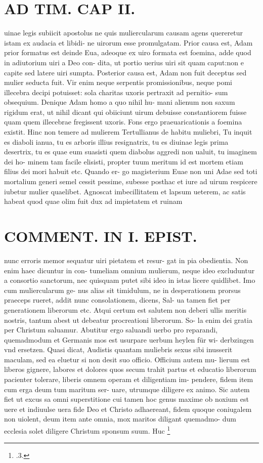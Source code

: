 \documentclass{article}
\begin{document}
\begin{pages}
\section*{AD TIM. CAP II. }
\marginpar{[ p.121 ]}\pstart uinae legis subiicit apostolus ne quis muliercularum causam agens quereretur istam ex audacia et libidi- ne uirorum esse promulgatam. Prior causa est, Adam prior formatus est deinde Eua, adeoque ex uiro formata est foemina, adde quod in adiutorium uiri a Deo con- dita, ut portio uerius uiri sit quam caput:non e capite sed latere uiri sumpta. Posterior causa est, Adam non fuit deceptus sed mulier seducta fuit. Vir enim neque serpentis promissionibus, neque pomi illecebra decipi potuisset: sola charitas uxoris pertraxit ad pernitio- sum obsequium. Denique Adam homo a quo nihil hu- mani alienum non saxum rigidum erat, ut nihil dicant qui obiiciunt uirum debuisse constantiorem fuisse quam quem illecebrae fregissent uxoris. Fons ergo praeuaricationis a foemina existit. Hinc non temere ad mulierem Tertullianus de habitu muliebri, Tu inquit es diaboli ianua, tu es arboris illius resignatrix, tu es diuinae legis prima desertrix, tu es quae eum suasisti quem diabolus aggredi non ualuit, tu imaginem dei ho- minem tam facile elisisti, propter tuum meritum id est mortem etiam filius dei mori habuit etc. Quando er- go magisterium Euae non uni Adae sed toti mortalium generi semel cessit pessime, subesse posthac et iure ad uirum respicere iubetur mulier quaelibet. Agnoscat imbecillitatem et lapsum ueterem, ac satis habeat quod quae olim fuit dux ad impietatem et ruinam  \pend
\section*{COMMENT. IN I. EPIST. }\pstart nunc erroris memor sequatur uiri pietatem et resur- gat in pia obedientia. Non enim haec dicuntur in con- tumeliam omnium mulierum, neque ideo excluduntur a consortio sanctorum, nec quisquam putet sibi ideo in istas licere quidlibet. Imo cum muliercularum ge- nus alias sit timidulum, ne in desperationem prorsus praeceps rueret, addit nunc consolationem, dicens, Sal- ua tamen fiet per generationem liberorum etc. Atqui certum est salutem non deberi ullis meritis nostris, tantum abest ut debeatur procreationi liberorum. So- la enim dei gratia per Christum saluamur. Abutitur ergo saluandi uerbo pro reparandi, quemadmodum et Germanis mos est usurpare uerbum heylen für wi- derbzingen vnd ersetzen. Quasi dicat, Audistis quantam muliebris sexus sibi inusserit maculam, sed ea eluetur si non desit suo officio. Officium autem mu- lierum est liberos gignere, labores et dolores quos secum trahit partus et educatio liberorum pacienter tolerare, liberis omnem operam et diligentiam im- pendere, fidem item cum erga deum tum maritum ser- uare, utrumque diligere ex animo. Sic autem fiet ut excus sa omni superstitione cui tamen hoc genus maxime ob noxium est uere et indiuulse uera fide Deo et Christo adhaereant, fidem quoque coniugalem non uiolent, deum item ante omnia, mox maritos diligant quemadmo- dum ecclesia solet diligere Christum sponsum suum. Huc  \pend\footnote{\footnotesizeGene.3. }

\end{pages}
\end{document}
